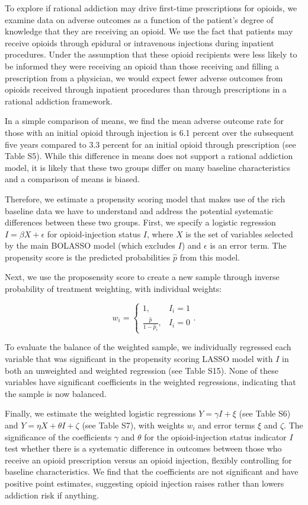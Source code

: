 \documentclass[9pt,twoside]{pnas-new}
\begin{document}
To explore if rational addiction may drive first-time prescriptions for opioids, we examine data on adverse outcomes as a function of the patient's degree of knowledge that they are receiving an opioid. We use the fact that patients may receive opioids through epidural or intravenous injections during inpatient procedures. Under the assumption that these opioid recipients were less likely to be informed they were receiving an opioid than those receiving and filling a prescription from a physician, we would expect fewer adverse outcomes from opioids received through inpatient procedures than through prescriptions in a rational addiction framework.

In a simple comparison of means, we find the mean adverse outcome rate for those with an initial opioid through injection is 6.1 percent over the subsequent five years compared to 3.3 percent for an initial opioid through prescription (see Table S5). While this difference in means does not support a rational addiction model, it is likely that these two groups differ on many baseline characteristics and a comparison of means is biased.

Therefore, we estimate a propensity scoring model that makes use of the rich baseline data we have to understand and address the potential systematic differences between these two groups. First, we specify a logistic regression $I = \beta X + \epsilon$ for opioid-injection status $I$, where $X$ is the set of variables selected by the main BOLASSO model (which excludes $I$) and $\epsilon$ is an error term. The propensity score is the predicted probabilities $\hat{p}$ from this model.

Next, we use the proposensity score to create a new sample through inverse probability of treatment weighting, with individual weights:

\[
w_i =
\begin{cases}
1, & I_i = 1 \\
\frac{\hat{p}}{1 - \hat{p}_i}, & I_i = 0
\end{cases}
.
\]

To evaluate the balance of the weighted sample, we individually regressed each variable that was significant in the propensity scoring LASSO model with $I$ in both an unweighted and weighted regression (see Table S15). None of these variables have significant coefficients in the weighted regressions, indicating that the sample is now balanced.

Finally, we estimate the weighted logistic regressions $Y = \gamma I + \xi$ (see Table S6) and $Y = \eta X + \theta I + \zeta$ (see Table S7), with weights $w_i$ and error terms $\xi$ and $\zeta$. The significance of the coefficients $\gamma$ and $\theta$ for the opioid-injection status indicator $I$ test whether there is a systematic difference in outcomes between those who receive an opioid prescription versus an opioid injection, flexibly controlling for baseline characteristics. We find that the coefficients are not significant and have positive point estimates, suggesting opioid injection raises rather than lowers addiction risk if anything.
\end{document}
